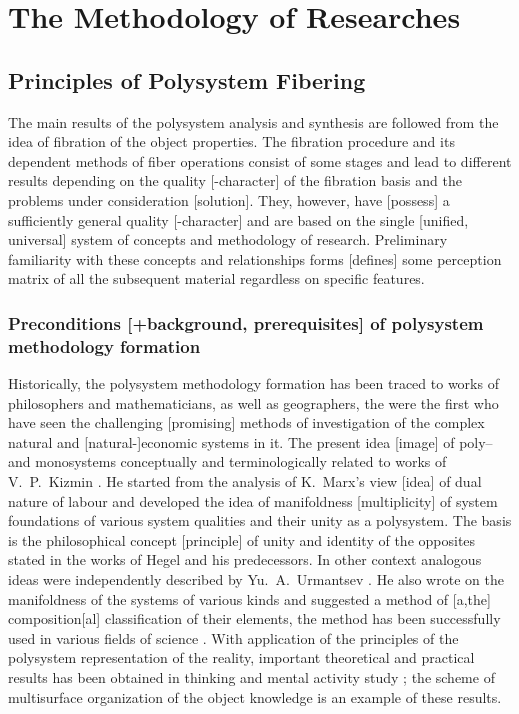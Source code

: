 \documentclass[12pt,leqno]{book}
\numberwithin{equation}{chapter}
\begin{document}
\part{The Methodology of Researches}
\chapter{Principles of Polysystem Fibering}
The main results of the polysystem analysis and synthesis are followed from the idea of fibration of the object properties. The fibration procedure and its dependent methods of fiber operations consist of some stages and lead to different results depending on the quality [-character] of the fibration basis and the problems under consideration [solution]. They, however, have [possess] a sufficiently general quality [-character] and are based on the single [unified, universal] system of concepts and methodology of research. Preliminary familiarity with these concepts and relationships forms [defines] some perception matrix of all the subsequent material regardless on specific features.

\section{Preconditions [+background, prerequisites] of polysystem methodology formation}

Historically, the polysystem methodology formation has been traced to works of philosophers and mathematicians, as well as geographers, the were the first who have seen the challenging [promising] methods of investigation of the complex natural and [natural-]economic systems in it. The present idea [image] of poly-- and monosystems conceptually and terminologically related to works of V.~P.~Kizmin \cite{b232,b233}. He started from the analysis of K.~Marx's view [idea] of dual nature of labour and developed the idea of manifoldness [multiplicity] of system foundations of various system qualities and their unity as a polysystem. The basis is the philosophical concept [principle] of unity and identity of the opposites stated in the works of Hegel and his predecessors. In other context analogous ideas were independently described by Yu.~A.~Urmantsev \cite{b428,b429,b432}. He also wrote on the manifoldness of the systems of various kinds and suggested a method of [a,the] composition[al] classification of their elements, the method has been successfully used in various fields of science \cite{b381}. With application of the principles of the polysystem representation of the reality, important theoretical and practical results has been obtained in thinking and mental activity study \cite{b101,b512}; the scheme of multisurface organization of the object knowledge is an example of these results.
\end{document}
